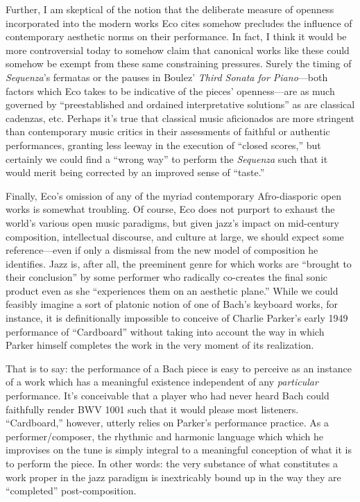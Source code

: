     Further, I am skeptical of the notion that the deliberate measure of openness incorporated into the modern works Eco cites somehow precludes the influence of contemporary aesthetic norms on their performance. In fact, I think it would be more controversial today to somehow claim that canonical works like these could somehow be exempt from these same constraining pressures. Surely the timing of \textit{Sequenza}'s fermatas or the pauses in Boulez' \textit{Third Sonata for Piano}---both factors which Eco takes to be indicative of the pieces' openness---are as much governed by ``preestablished and ordained interpretative solutions'' as are classical cadenzas, etc. Perhaps it's true that classical music aficionados are more stringent than contemporary music critics in their assessments of faithful or authentic performances, granting less leeway in the execution of ``closed scores,'' but certainly we could find a ``wrong way'' to perform the \textit{Sequenza} such that it would merit being corrected by an improved sense of ``taste.''

    Finally, Eco's omission of any of the myriad contemporary Afro-diasporic open works is somewhat troubling. Of course, Eco does not purport to exhaust the world's various open music paradigms, but given jazz's impact on mid-century composition, intellectual discourse, and culture at large, we should expect some reference---even if only a dismissal from the new model of composition he identifies. Jazz is, after all, the preeminent genre for which works are ``brought to their conclusion'' by some performer who radically co-creates the final sonic product even as she ``experiences them on an aesthetic plane.'' While we could feasibly imagine a sort of platonic notion of one of Bach's keyboard works, for instance, it is definitionally impossible to conceive of Charlie Parker's early 1949 performance of ``Cardboard'' without taking into account the way in which Parker himself completes the work in the very moment of its realization. 

    That is to say: the performance of a Bach piece is easy to perceive as an instance of a work which has a meaningful existence independent of any \textit{particular} performance. It's conceivable that a player who had never heard Bach could faithfully render BWV 1001 such that it would please most listeners. ``Cardboard,'' however, utterly relies on Parker's performance practice. As a performer/composer, the rhythmic and harmonic language which which he improvises on the tune is simply integral to a meaningful conception of what it is to perform the piece. In other words: the very substance of what constitutes a work proper in the jazz paradigm is inextricably bound up in the way they are ``completed'' post-composition. 
        
